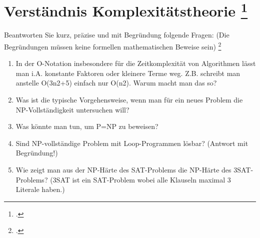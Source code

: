 \documentclass{lehramt-informatik-aufgabe}
\begin{document}
\section{Verständnis Komplexitätstheorie
\footcite{66115:2016:03}}

Beantworten Sie kurz, präzise und mit Begründung folgende Fragen: (Die
Begründungen müssen keine formellen mathematischen Beweise sein)
\footcite[Aufgabe 15: StEx F2016 T2 A3, StEx H2017 T1 A3]{theo:ab:4}

\begin{enumerate}


\item In der O-Notation insbesondere für die Zeitkomplexität von
Algorithmen lässt man i.A. konstante Faktoren oder kleinere Terme weg.
Z.B. schreibt man anstelle O(3n2+5) einfach nur O(n2). Warum macht man
das so?


\item Was ist die typische Vorgehensweise, wenn man für ein neues
Problem die NP-Vollständigkeit untersuchen will?


\item Was könnte man tun, um P=NP zu beweisen?

\item Sind NP-vollständige Problem mit Loop-Programmen lösbar? (Antwort
mit Begründung!)


\item Wie zeigt man aus der NP-Härte des SAT-Problems die NP-Härte des
3SAT-Problems? (3SAT ist ein SAT-Problem wobei alle Klauseln maximal 3
Literale haben.)

\end{enumerate}
\end{document}
